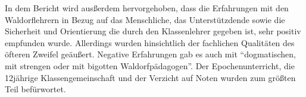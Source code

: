 In dem Bericht wird ausßerdem hervorgehoben, dass die Erfahrungen mit den Waldorflehrern in Bezug auf das Menschliche, das Unterstützdende sowie die Sicherheit und Orientierung die durch den Klassenlehrer gegeben ist, sehr positiv empfunden wurde. Allerdings wurden hinsichtlich der fachlichen Qualitäten des öfteren Zweifel geäußert. Negative Erfahrungen gab es auch mit \enquote{dogmatischen, mit strengen oder mit bigotten Waldorfpädagogen}. Der Epochenunterricht, die 12jährige Klassengemeinschaft und der Verzicht auf Noten wurden zum größten Teil befürwortet. 















